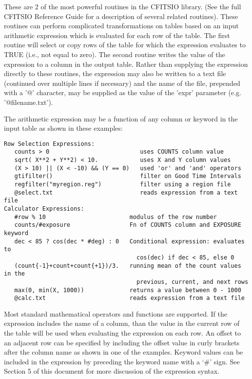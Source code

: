 \documentclass[11pt]{article}
\begin{document}
These are 2 of the most powerful routines in the CFITSIO library.  (See
the full CFITSIO Reference Guide for a description of several related
routines).  These routines can perform complicated transformations on
tables based on an input arithmetic expression which is evaluated for
each row of the table.  The first routine will select or copy rows of
the table for which the expression evaluates to TRUE (i.e., not equal
to zero).  The second routine writes the value of the expression to a
column in the output table.  Rather than supplying the expression
directly to these routines, the expression may also be written to a
text file (continued over multiple lines if necessary) and the name of
the file, prepended with a '@' character, may be supplied as the value
of the 'expr' parameter (e.g.  '@filename.txt').

The arithmetic expression may be a function of any column or keyword in
the input table as shown in these examples:

\begin{verbatim}
Row Selection Expressions:
   counts > 0                          uses COUNTS column value
   sqrt( X**2 + Y**2) < 10.            uses X and Y column values
   (X > 10) || (X < -10) && (Y == 0)   used 'or' and 'and' operators  
   gtifilter()                         filter on Good Time Intervals
   regfilter("myregion.reg")           filter using a region file
   @select.txt                         reads expression from a text file
Calculator Expressions:
   #row % 10                        modulus of the row number
   counts/#exposure                 Fn of COUNTS column and EXPOSURE keyword
   dec < 85 ? cos(dec * #deg) : 0   Conditional expression: evaluates to
                                      cos(dec) if dec < 85, else 0
   (count{-1}+count+count{+1})/3.   running mean of the count values in the
                                      previous, current, and next rows
   max(0, min(X, 1000))             returns a value between 0 - 1000
   @calc.txt                        reads expression from a text file
\end{verbatim}

Most standard mathematical operators and functions are supported.  If
the expression includes the name of a column, than the value in the
current row of the table will be used when evaluating the expression on
each row.   An offset to an adjacent row can be specified by including
the offset value in curly brackets after the column name as shown in
one of the examples.  Keyword values can be included in the expression
by preceding the keyword name with a `\#' sign.   See Section 5 of this
document for more discussion of the expression syntax.
\end{document}

